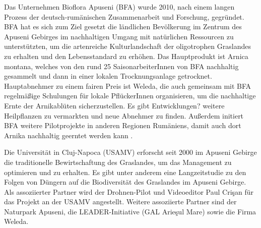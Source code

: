 Das Unternehmen Bioflora Apuseni (BFA) wurde 2010, nach einem langen Prozess der deutsch-rumänischen Zusammenarbeit und Forschung, gegründet. BFA hat es sich zum Ziel gesetzt die ländlichen Bevölkerung im Zentrum des Apuseni Gebirges im nachhaltigen Umgang mit natürlichen Ressourcen zu unterstützten, um die artenreiche Kulturlandschaft der oligotrophen Graslandes zu erhalten und den Lebensstandard zu erhöhen. Das Hauptprodukt ist Arnica montana, welches von den rund 25 SaisonarbeiterInnen von BFA nachhaltig gesammelt und dann in einer lokalen Trocknungsanlage getrocknet. Hauptabnehmer zu einem fairen Preis ist Weleda, die auch gemeinsam mit BFA regelmäßige Schulungen für lokale PflückerInnen organisieren, um die nachhaltige Ernte der Arnikablüten sicherzustellen. Es gibt Entwicklungen? weitere Heilpflanzen zu vermarkten und neue Abnehmer zu finden. Außerdem initiert BFA weitere Pilotprojekte in anderen Regionen Rumäniens, damit auch dort Arnika nachhaltig geerntet werden kann \citep[vgl.][]{ECOKARST2018,DBU2018}.

Die Universität in Cluj-Napoca (USAMV) erforscht seit 2000 im Apuseni Gebirge die traditionelle Bewirtschaftung des Graslandes, um das Management zu optimieren und zu erhalten. Es gibt unter anderem eine Langzeitstudie zu den Folgen von Düngern auf die Biodiversität des Graslandes im Apuseni Gebirge. Als assoziierter Partner wird der Drohnen-Pilot und Videoeditor Paul Crişan für das Projekt an der USAMV angestellt. Weitere assoziierte Partner sind der Naturpark Apuseni, die LEADER-Initiative (GAL Arieşul Mare) sowie die Firma Weleda.

